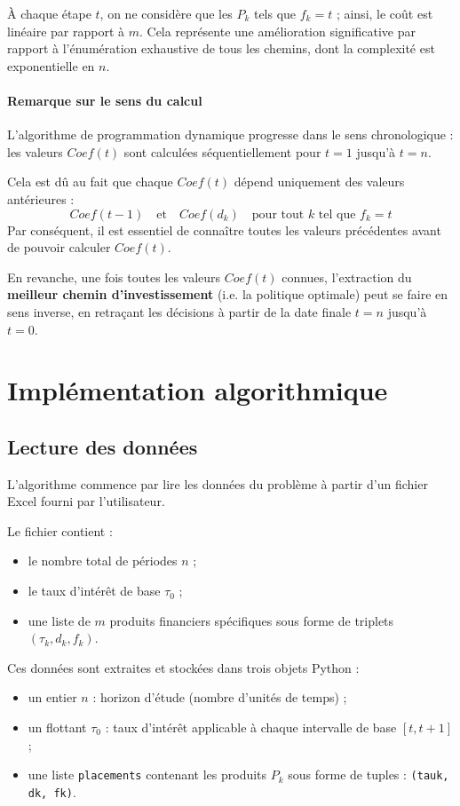 \documentclass[a4paper,11pt]{article}
\begin{document}
    À chaque étape $t$, on ne considère que les $P_k$ tels que $f_k = t$ ; ainsi, le coût est linéaire par rapport à $m$. Cela représente une amélioration significative par rapport à l’énumération exhaustive de tous les chemins, dont la complexité est exponentielle en $n$.

    \paragraph{Remarque sur le sens du calcul}

    L’algorithme de programmation dynamique progresse dans le sens chronologique : les valeurs $Coef(t)$ sont calculées séquentiellement pour $t = 1$ jusqu’à $t = n$.

    Cela est dû au fait que chaque $Coef(t)$ dépend uniquement des valeurs antérieures :
    \[
    Coef(t-1) \quad \text{et} \quad Coef(d_k) \quad \text{pour tout } k \text{ tel que } f_k = t
    \]
Par conséquent, il est essentiel de connaître toutes les valeurs précédentes avant de pouvoir calculer $Coef(t)$.

En revanche, une fois toutes les valeurs $Coef(t)$ connues, l’extraction du \textbf{meilleur chemin d’investissement} (i.e. la politique optimale) peut se faire en sens inverse, en retraçant les décisions à partir de la date finale $t = n$ jusqu’à $t = 0$.

    \section{Implémentation algorithmique}
    \subsection{Lecture des données}

L’algorithme commence par lire les données du problème à partir d’un fichier Excel fourni par l’utilisateur.

Le fichier contient :
\begin{itemize}
    \item le nombre total de périodes $n$ ;
    \item le taux d’intérêt de base $\tau_0$ ;
    \item une liste de $m$ produits financiers spécifiques sous forme de triplets $(\tau_k, d_k, f_k)$.
\end{itemize}

Ces données sont extraites et stockées dans trois objets Python :
\begin{itemize}
    \item un entier $n$ : horizon d’étude (nombre d’unités de temps) ;
    \item un flottant $\tau_0$ : taux d’intérêt applicable à chaque intervalle de base $[t, t+1]$ ;
    \item une liste \texttt{placements} contenant les produits $P_k$ sous forme de tuples : \texttt{(tauk, dk, fk)}.
\end{itemize}
\end{document}
